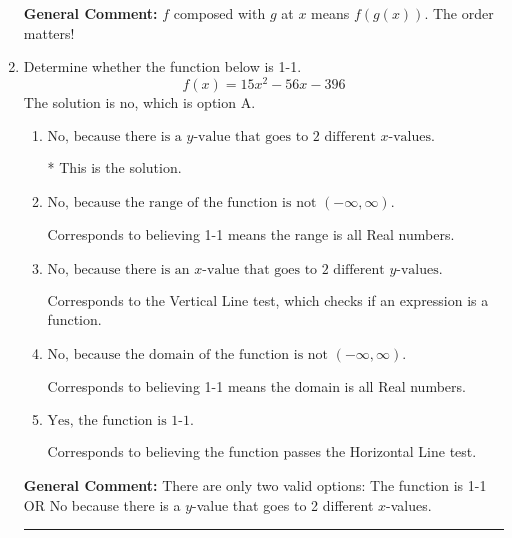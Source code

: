 \documentclass{extbook}[14pt]
\newcommand{\litem}[1]{\item #1

\rule{\textwidth}{0.4pt}}
\begin{document}
\begin{enumerate}
{\textbf{General Comment:} $f$ composed with $g$ at $x$ means $f(g(x))$. The order matters!
}
\litem{
Determine whether the function below is 1-1.
\[ f(x) = 15 x^2 - 56 x - 396 \]The solution is \( \text{no} \), which is option A.\begin{enumerate}[label=\Alph*.]
\item \( \text{No, because there is a $y$-value that goes to 2 different $x$-values.} \)

* This is the solution.
\item \( \text{No, because the range of the function is not $(-\infty, \infty)$.} \)

Corresponds to believing 1-1 means the range is all Real numbers.
\item \( \text{No, because there is an $x$-value that goes to 2 different $y$-values.} \)

Corresponds to the Vertical Line test, which checks if an expression is a function.
\item \( \text{No, because the domain of the function is not $(-\infty, \infty)$.} \)

Corresponds to believing 1-1 means the domain is all Real numbers.
\item \( \text{Yes, the function is 1-1.} \)

Corresponds to believing the function passes the Horizontal Line test.
\end{enumerate}

\textbf{General Comment:} There are only two valid options: The function is 1-1 OR No because there is a $y$-value that goes to 2 different $x$-values.
}
\end{enumerate}
\end{document}
